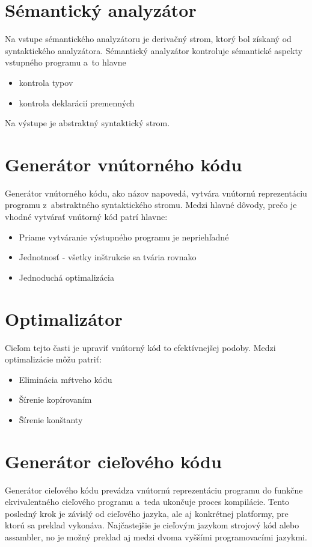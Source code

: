 \section{Sémantický analyzátor}
Na vstupe sémantického analyzátoru je derivačný strom, ktorý bol získaný od
syntaktického analyzátora. Sémantický analyzátor kontroluje sémantické aspekty
vstupného programu a~to hlavne 
\begin{itemize}
    \item kontrola typov
    \item kontrola deklarácií premenných
\end{itemize}
Na výstupe je abstraktný syntaktický strom.

\section{Generátor vnútorného kódu}
Generátor vnútorného kódu, ako názov napovedá, vytvára vnútornú reprezentáciu programu
z~abstraktného syntaktického stromu. Medzi hlavné dôvody, prečo je vhodné
vytvárať vnútorný kód patrí hlavne:
\begin{itemize}
    \item Priame vytváranie výstupného programu je nepriehľadné
    \item Jednotnosť - všetky inštrukcie sa tvária rovnako
    \item Jednoduchá optimalizácia
\end{itemize}

\section{Optimalizátor}
Cieľom tejto časti je upraviť vnútorný kód to efektívnejšej podoby.
Medzi optimalizácie môžu patriť:
\begin{itemize}
    \item Eliminácia mŕtveho kódu
    \item Šírenie kopírovaním
    \item Šírenie konštanty
\end{itemize}

\section{Generátor cieľového kódu}
Generátor cieľového kódu prevádza vnútornú reprezentáciu programu do funkčne ekvivalentného
cieľového programu a~teda ukončuje proces kompilácie. Tento posledný krok je závislý od cieľového
jazyka, ale aj konkrétnej platformy, pre ktorú sa preklad vykonáva. Najčastejšie je cieľovým jazykom
strojový kód alebo assambler, no je možný preklad aj medzi dvoma vyššími programovacími jazykmi. \cite{meduna}

